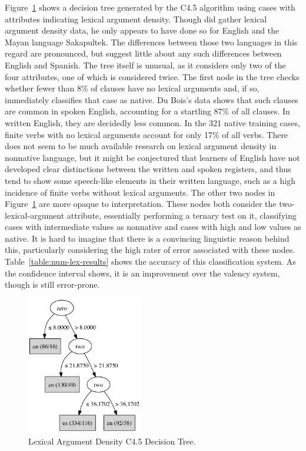 \documentclass[main.tex]{subfiles}
\begin{document}
Figure~\ref{fig:c4.5-num-lex} shows a decision tree generated by the C4.5 algorithm using cases with attributes indicating lexical argument density. Though \citet{dubois:2003} did gather lexical argument density data, he only appears to have done so for English and the Mayan language Sakapultek. The differences between those two languages in this regard are pronounced, but suggest little about any such differences between English and Spanish. The tree itself is unusual, as it considers only two of the four attributes, one of which is considered twice. The first node in the tree checks whether fewer than 8\% of clauses have no lexical arguments and, if so, immediately classifies that case as native. Du Bois's data shows that such clauses are common in spoken English, accounting for a startling 87\% of all clauses. In written English, they are decidedly less common. In the 321 native training cases, finite verbs with no lexical arguments account for only 17\% of all verbs. There does not seem to be much available research on lexical argument density in nonnative language, but it might be conjectured that learners of English have not developed clear distinctions between the written and spoken registers, and thus tend to show some speech-like elements in their written language, such as a high incidence of finite verbs without lexical arguments. The other two nodes in Figure~\ref{fig:c4.5-num-lex} are more opaque to interpretation. These nodes both consider the two-lexical-argument attribute, essentially performing a ternary test on it, classifying cases with intermediate values as nonnative and cases with high and low values as native. It is hard to imagine that there is a convincing linguistic reason behind this, particularly considering the high rater of error associated with these nodes. Table~\ref{table:num-lex-results} shows the accuracy of this classification system. As the confidence interval shows, it is an improvement over the valency system, though is still error-prone.

\begin{figure}[ht]
\centering
\includegraphics[width=2in]{c45-num-lex.pdf}
\caption{Lexical Argument Density C4.5 Decision Tree.}
\label{fig:c4.5-num-lex}
\end{figure}
\end{document}

